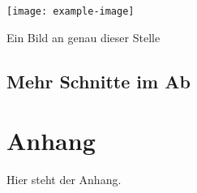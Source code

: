\documentclass[%
	paper		=	a4,							%
	fontsize	=	11pt,						%
	DIV			=	calc,						%
	twocolumn	=	false,						%
	twoside		=	false,						%
	headsepline	=	true,						%
]{scrreprt}										%
\begin{document}
\blindtext

\begin{center}
	\captionsetup{type=figure}
	\texttt{[image: example-image]}
	\caption{Ein Bild an genau dieser Stelle}
	\label{fig:6}
\end{center}

\section{Mehr Schnitte im Ab}

\blindtext[2]


\printbibliography


\appendix

\chapter{Anhang}
Hier steht der Anhang.



\end{document}
